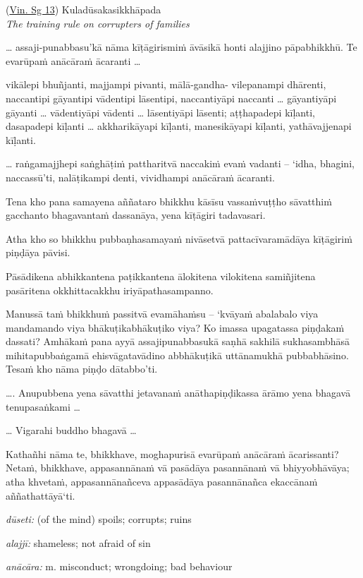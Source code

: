\documentclass[11pt,oneside]{memoir}
\begin{document}
\begin{widecols}
(\href{https://suttacentral.net/pli-tv-bu-vb-ss13/pli/ms}{Vin. Sg 13}) Kuladūsakasikkhāpada \\[0pt]
\emph{The training rule on corrupters of families}

\ldots{} assaji-punabbasu'kā nāma kīṭāgirismiṁ āvāsikā honti alajjino pāpabhikkhū. Te evarūpaṁ anācāraṁ ācaranti \ldots{}

vikālepi bhuñjanti, majjampi pivanti, mālā-gandha- vilepanampi dhārenti,
naccantipi gāyantipi vādentipi lāsentipi,
naccantiyāpi naccanti \ldots{} gāyantiyāpi gāyanti \ldots{} vādentiyāpi vādenti \ldots{} lāsentiyāpi lāsenti;
aṭṭhapadepi kīḷanti, dasapadepi kīḷanti \ldots{} akkharikāyapi kīḷanti, manesikāyapi kīḷanti, yathāvajjenapi kīḷanti.

\ldots{} raṅgamajjhepi saṅghāṭiṁ pattharitvā naccakiṁ evaṁ vadanti -- `idha, bhagini,
naccassū'ti, nalāṭikampi denti, vividhampi anācāraṁ ācaranti.

Tena kho pana samayena aññataro bhikkhu kāsīsu vassaṁvuṭṭho sāvatthiṁ gacchanto
bhagavantaṁ dassanāya, yena kīṭāgiri tadavasari.

Atha kho so bhikkhu pubbaṇhasamayaṁ nivāsetvā pattacīvaramādāya kīṭāgiriṁ
piṇḍāya pāvisi.

Pāsādikena abhikkantena paṭikkantena ālokitena vilokitena samiñjitena pasāritena
okkhittacakkhu iriyāpathasampanno.

Manussā taṁ bhikkhuṁ passitvā evamāhaṁsu -- `kvāyaṁ abalabalo viya mandamando viya
bhākuṭikabhākuṭiko viya? Ko imassa upagatassa piṇḍakaṁ dassati? Amhākaṁ pana
ayyā assajipunabbasukā saṇhā sakhilā sukhasambhāsā mihitapubbaṅgamā
ehisvāgatavādino abbhākuṭikā uttānamukhā pubbabhāsino. Tesaṁ kho nāma piṇḍo
dātabbo'ti.

\ldots{}. Anupubbena yena sāvatthi jetavanaṁ anāthapiṇḍikassa ārāmo yena bhagavā tenupasaṅkami \ldots{}

\ldots{} Vigarahi buddho bhagavā \ldots{}

Kathañhi nāma te, bhikkhave, moghapurisā evarūpaṁ anācāraṁ ācarissanti?
Netaṁ, bhikkhave, appasannānaṁ vā pasādāya pasannānaṁ vā bhiyyobhāvāya;
atha khvetaṁ, appasannānañceva appasādāya pasannānañca ekaccānaṁ aññathattāyā`ti.

\columnbreak

\emph{dūseti:} (of the mind) spoils; corrupts; ruins

\emph{alajjī:} shameless; not afraid of sin

\emph{anācāra:} m. misconduct; wrongdoing; bad behaviour


\end{widecols}
\end{document}
